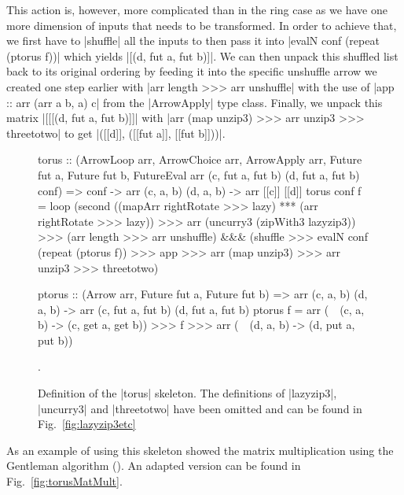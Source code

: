 This action is, however,  more complicated than in the ring case as we have one more dimension of inputs that needs to be transformed. In order to achieve that, we first have to |shuffle| all the inputs to then pass it into |evalN conf (repeat (ptorus f))| which yields |[(d, fut a, fut b)]|. We can then unpack this shuffled list back to its original ordering by feeding it into the specific unshuffle arrow we created one step earlier with |arr length >>> arr unshuffle| with the use of |app :: arr (arr a b, a) c| from the |ArrowApply| type class. Finally, we unpack this matrix |[[[(d, fut a, fut b)]]| with |arr (map unzip3) >>> arr unzip3 >>> threetotwo| to get  |([[d]], ([[fut a]], [[fut b]]))|.

\begin{figure}[tb]
\begin{code}
torus :: (ArrowLoop arr, ArrowChoice arr, ArrowApply arr, Future fut a, Future fut b,
          FutureEval arr (c, fut a, fut b) (d, fut a, fut b) conf) =>
	conf -> arr (c, a, b) (d, a, b) -> arr [[c]] [[d]]
torus conf f =
	loop (second ((mapArr rightRotate >>> lazy) *** (arr rightRotate >>> lazy)) >>>
	arr (uncurry3 (zipWith3 lazyzip3)) >>>
	(arr length >>> arr unshuffle) &&& (shuffle >>> evalN conf (repeat (ptorus f)) >>> app >>>
	arr (map unzip3) >>> arr unzip3 >>> threetotwo)

ptorus :: (Arrow arr, Future fut a, Future fut b) =>
	arr (c, a, b) (d, a, b) -> arr (c, fut a, fut b) (d, fut a, fut b)
ptorus f = arr (\ ~(c, a, b) -> (c, get a, get b)) >>> f >>> arr (\ ~(d, a, b) -> (d, put a, put b))
\end{code} %
\caption{Definition of the |torus| skeleton. The definitions of |lazyzip3|, |uncurry3| and |threetotwo| have been omitted and can be found in Fig.~\ref{fig:lazyzip3etc}}.
\label{fig:torus}
\end{figure}
As an example of using this skeleton \citet{Eden:SkeletonBookChapter02} showed the matrix multiplication using the Gentleman algorithm (\citeyear{Gentleman1978}). An adapted version can be found in Fig.~\ref{fig:torusMatMult}.
